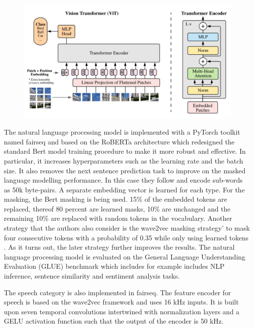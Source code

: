 \documentclass[
]{krantz}
\begin{document}
\begin{figure}

{\centering \includegraphics[width=1\linewidth]{figures/05-chapter2/visiontransformer} 

}

\caption{\citet{DosovitskiyB0WZ21}}\label{fig:visiontransformer}
\end{figure}



The natural language processing model is implemented with a PyTorch toolkit named fairseq and based on the RoBERTa \citep{liu2019roberta} architecture which redesigned the standard Bert model training procedure to make it more robust and effective. In particular, it increases hyperparameters such as the learning rate and the batch size. It also removes the next sentence prediction task to improve on the masked language modelling performance. In this case they follow \citet{sennrich2015neural} and encode sub-words as 50k byte-pairs. A separate embedding vector is learned for each type. For the masking, the Bert masking is being used. 15\% of the embedded tokens are replaced, thereof 80 percent are learned masks, 10\% are unchanged and the remaining 10\% are replaced with random tokens in the vocabulary. Another strategy that the authors also consider is the wave2vec masking strategy' to mask four consecutive tokens with a probability of 0.35 while only using learned tokens \citep{baevski2020wav2vec}. As it turns out, the later strategy further improves the results. The natural language processing model is evaluated on the General Language Understanding Evaluation (GLUE) benchmark \citep{wang2018glue} which includes for example includes NLP inference, sentence similarity and sentiment analysis tasks.

The speech category is also implemented in fairseq. The feature encoder for speech is based on the wave2vec framework and uses 16 kHz inputs. It is built upon seven temporal convolutions intertwined with normalization layers and a GELU activation function such that the output of the encoder is 50 kHz.
\end{document}
